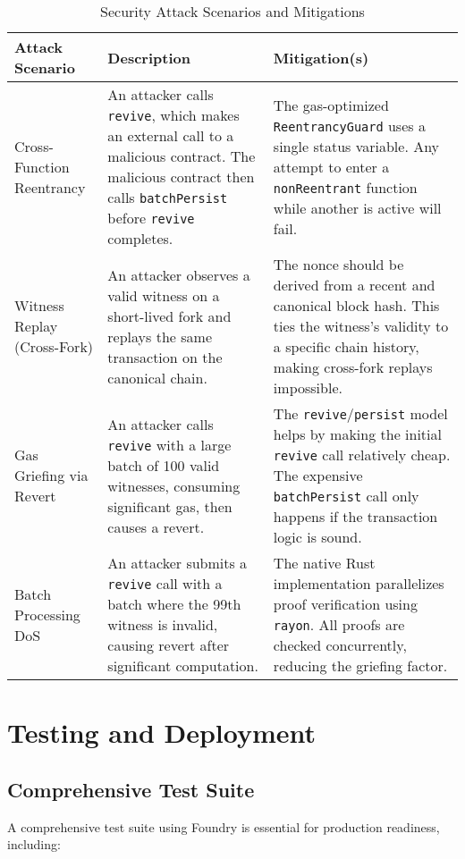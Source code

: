 \documentclass{article}
\begin{document}
\begin{table}[h]
\centering
\begin{tabular}{|p{3cm}|p{5cm}|p{6cm}|}
\hline
\textbf{Attack Scenario} & \textbf{Description} & \textbf{Mitigation(s)} \\
\hline
Cross-Function Reentrancy & An attacker calls \texttt{revive}, which makes an external call to a malicious contract. The malicious contract then calls \texttt{batchPersist} before \texttt{revive} completes. & The gas-optimized \texttt{ReentrancyGuard} uses a single status variable. Any attempt to enter a \texttt{nonReentrant} function while another is active will fail. \\
\hline
Witness Replay (Cross-Fork) & An attacker observes a valid witness on a short-lived fork and replays the same transaction on the canonical chain. & The nonce should be derived from a recent and canonical block hash. This ties the witness's validity to a specific chain history, making cross-fork replays impossible. \\
\hline
Gas Griefing via Revert & An attacker calls \texttt{revive} with a large batch of 100 valid witnesses, consuming significant gas, then causes a revert. & The \texttt{revive}/\texttt{persist} model helps by making the initial \texttt{revive} call relatively cheap. The expensive \texttt{batchPersist} call only happens if the transaction logic is sound. \\
\hline
Batch Processing DoS & An attacker submits a \texttt{revive} call with a batch where the 99th witness is invalid, causing revert after significant computation. & The native Rust implementation parallelizes proof verification using \texttt{rayon}. All proofs are checked concurrently, reducing the griefing factor. \\
\hline
\end{tabular}
\caption{Security Attack Scenarios and Mitigations}
\end{table}

\section{Testing and Deployment}

\subsection{Comprehensive Test Suite}

A comprehensive test suite using Foundry is essential for production readiness, including:
\end{document}
